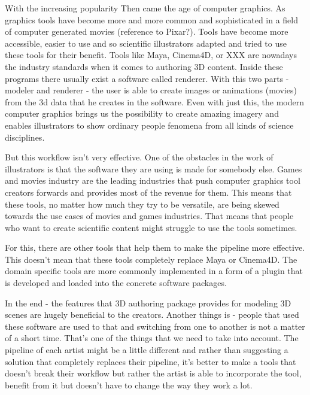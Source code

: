 \documentclass[
  digital, %
  table,   %
  nolof,     %
  nolot,     %
]{fithesis3}
\begin{document}
With the increasing popularity 
Then came the age of computer graphics. As graphics tools have become more and more common and sophisticated in a field of computer generated movies (reference to Pixar?). Tools have become more accessible, easier to use and so scientific illustrators adapted and tried to use these tools for their benefit. Tools like Maya, Cinema4D, or XXX are nowadays the industry standards when it comes to authoring 3D content. Inside these programs there usually exist a software called renderer. With this two parts - modeler and renderer - the user is able to create images or animations (movies) from the 3d data that he creates in the software.
Even with just this, the modern computer graphics brings us the possibility to create amazing imagery and enables illustrators to show ordinary people fenomena from all kinds of science disciplines.

But this workflow isn't very effective. One of the obstacles in the work of illustrators is that the software they are using is made for somebody else. Games and movies industry are the leading industries that push computer graphics tool creators forwards and provides most of the revenue for them. This means that these tools, no matter how much they try to be versatile, are being skewed towards the use cases of movies and games industries. That means that people who want to create scientific content might struggle to use the tools sometimes.

For this, there are other tools that help them to make the pipeline more effective. This doesn't mean that these tools completely replace Maya or Cinema4D. The domain specific tools are more commonly implemented in a form of a plugin that is developed and loaded into the concrete software packages.

In the end - the features that 3D authoring package provides for modeling 3D scenes are hugely beneficial to the creators. Another things is - people that used these software are used to that and switching from one to another is not a matter of a short time. That's one of the things that we need to take into account. The pipeline of each artist might be a little different and rather than suggesting a solution that completely replaces their pipeline, it's better to make a tools that doesn't break their workflow but rather the artist is able to incorporate the tool, benefit from it but doesn't have to change the way they work a lot.
\end{document}
